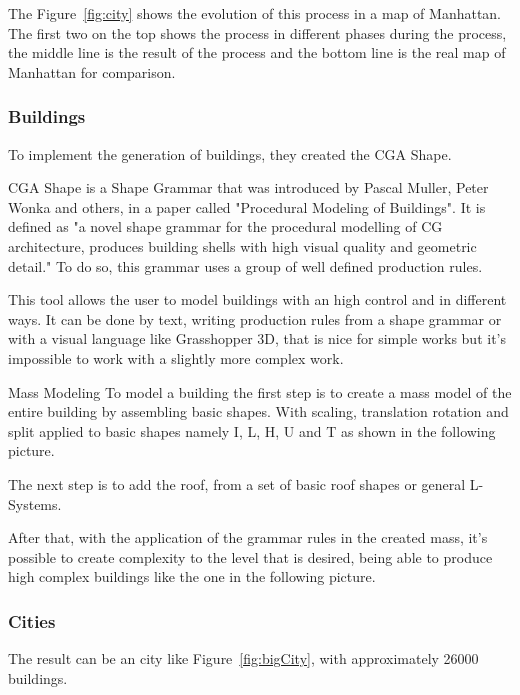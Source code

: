 The Figure~\ref{fig:city} shows the evolution of this process in a map of Manhattan. The first two on the top shows the process in different phases during the process, the middle line is the result of the process and the bottom line is the real map of Manhattan for comparison.


\subsubsection{Buildings} %
\label{ssub:buildings1}

To implement the generation of buildings, they created the CGA Shape.

CGA Shape is a Shape Grammar that was introduced by Pascal Muller, Peter Wonka and others, in a paper called "Procedural Modeling of Buildings". It is defined as "a novel shape grammar for the procedural modelling of CG architecture, produces building shells with high visual quality and geometric detail." To do so, this grammar uses a group of well defined production rules.

This tool allows the user to model buildings with an high control and in different ways. It can be done by text, writing production rules from a shape grammar or with a visual language like Grasshopper 3D, that is nice for simple works but it's impossible to work with a slightly more complex work. 

Mass Modeling
To model a building the first step is to create a mass model of the entire building by assembling basic shapes. With scaling, translation rotation and split applied to basic shapes namely I, L, H, U and T as shown in the following picture.

The next step is to add the roof, from a set of basic roof shapes or general L-Systems.

After that, with the application of the grammar rules in the created mass, it's possible to create complexity to the level that is desired, being able to produce high complex buildings like the one in the following picture.


\subsubsection{Cities} %
\label{ssub:Cities1}

The result can be an city like Figure~\ref{fig:bigCity}, with approximately 26000 buildings.

